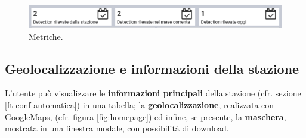 \begin{figure}[H]
    \begin{center}
    \includegraphics[width=\textwidth]{images/metriche.png}
    \caption{Metriche.}
    \end{center}
\end{figure}

\subsection{Geolocalizzazione e informazioni della stazione}

L'utente può visualizzare le \textbf{informazioni principali} della stazione (cfr. sezione \ref{ft-conf-automatica}) in una tabella; la \textbf{geolocalizzazione}, realizzata con GoogleMaps, (cfr. figura \ref{fig:homepage}) ed infine, se presente, la \textbf{maschera}, mostrata in una finestra modale, con possibilità di download.

